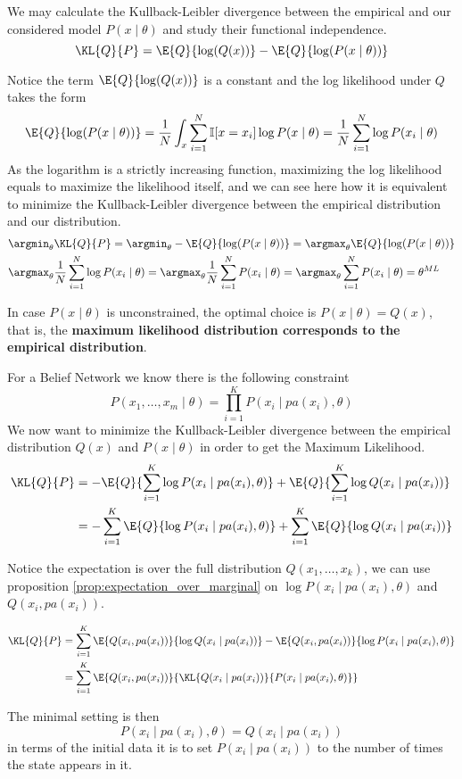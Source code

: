 We may calculate the Kullback-Leibler divergence between the empirical and our considered model \(P(x \mid \theta)\) and study their functional independence.
\[
  \KL{Q}{P} = \E{Q}{\log(Q(x))} - \E{Q}{\log(P(x \mid \theta))}
\]

Notice the term \(\E{Q}{\log(Q(x))}\) is a constant and the log likelihood under \(Q\) takes the form
\[
   \E{Q}{\log(P(x \mid \theta))} = \frac{1}{N}\int_{x}\sum_{i=1}^{N}\mathbb{I}[x = x_{i}]\log{P(x \mid \theta)} = \frac{1}{N}\sum_{i = 1}^N \log{P(x_i \mid \theta)}
 \]
 As the logarithm is
 a strictly increasing function, maximizing the log likelihood equals to
 maximize the likelihood itself, and we can see here how it is equivalent to
 minimize the Kullback-Leibler divergence between the empirical distribution and
 our distribution.
 \[
   \begin{aligned}
     &\argmin_{\theta} \KL{Q}{P} = \argmin_{\theta} - \E{Q}{\log(P(x \mid \theta))} =  \argmax_{\theta} \E{Q}{\log(P(x \mid \theta))}\\
     &\argmax_{\theta} \frac{1}{N}\sum_{i=1}^{N}\log{P(x_{i} \mid \theta)} =  \argmax_{\theta} \frac{1}{N}\sum_{i=1}^{N}P(x_{i} \mid \theta) = \argmax_{\theta} \sum_{i=1}^{N}P(x_{i}\mid \theta)= \theta^{ML}
   \end{aligned}
 \]

 In case \(P(x \mid \theta)\) is unconstrained, the optimal choice is \(P(x \mid \theta) = Q(x)\), that
 is, the \textbf{maximum likelihood distribution corresponds to the empirical distribution}.

 For a Belief Network we know there is the following constraint
 \[
   P(x_{1}, \dots, x_{m} \mid \theta) = \prod_{i = 1}^K P(x_i  \mid  pa(x_i), \theta)
 \]
 We now want to minimize the Kullback-Leibler divergence between the empirical
 distribution \(Q(x)\) and \(P(x \mid \theta)\) in order to get the Maximum Likelihood.
 \[
   \begin{aligned}
   \KL{Q}{P} &= - \E{Q}{\sum_{i = 1}^K\log{P(x_i \mid pa(x_i), \theta)}} +
   \E{Q}{\sum_{i = 1}^K\log{Q(x_i \mid pa(x_i))}}
   \\ &= - \sum_{i =
     1}^K \E{Q}{\log{P(x_i \mid pa(x_i), \theta)}} + \sum_{i =
     1}^K \E{Q}{\log{Q(x_i \mid pa(x_i))}}
   \end{aligned}
 \]

 Notice the expectation is over the full distribution \(Q(x_{1},\dots, x_{k})\), we can use proposition \ref{prop:expectation_over_marginal} on \(\log{P(x_i \mid pa(x_i), \theta)}\) and \(Q(x_{i}, pa(x_{i}))\).

 \[
   \begin{aligned}
     \KL{Q}{P} &= \sum_{i = 1}^K \E{Q(x_i,pa(x_i))}{\log{Q(x_i \mid pa(x_i))}} - \E{Q(x_i,pa(x_i))}{\log{P(x_i \mid pa(x_i), \theta)}}\\
     &= \sum_{i = 1}^K \E{Q(x_i,pa(x_i))}{\KL{Q(x_i \mid pa(x_i))}{P(x_i \mid pa(x_i), \theta)}}
   \end{aligned}
 \]

 The minimal setting is then
 \[
   P(x_i \mid pa(x_i), \theta) = Q(x_i \mid pa(x_i))
 \]
 in terms of the initial data it is to set \(P(x_i \mid pa(x_i))\) to the number of
 times the state appears in it.
